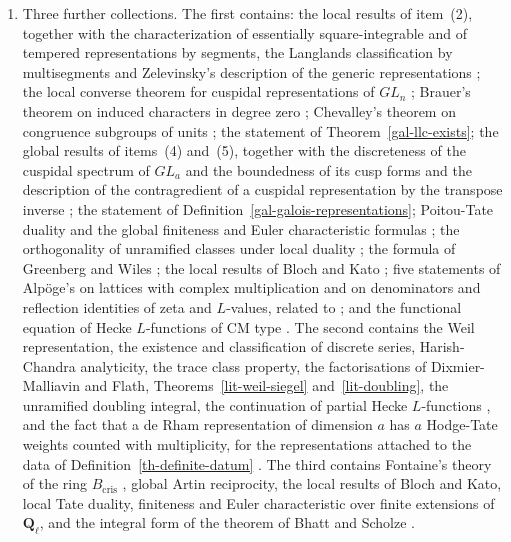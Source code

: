 \begin{theorem}
\begin{enumerate}
  Berger's theorem that de Rham representations are potentially semistable
  \cite{Ber02}; Theorem~\ref{lit-bhatt-scholze};
  Theorem~\ref{lit-chebotarev-degree-one} and a second form of the
  Chebotarev density theorem \cite{Che26,Neu99}; the existence, for each prime
  $p\equiv3\pmod 4$ with $p>3$, of an elliptic curve with complex
  multiplication by the integers of $\mathbf Q(\sqrt{-p})$, good reduction
  outside $p$ and minimal discriminant $-p^3$ \cite{Gro80}; Weber's
  description of ray class fields of imaginary quadratic fields
  \cite[Theorem~II.5.6]{Sil94}; and local Tate duality, the finiteness of
  local Galois cohomology and the local Euler characteristic formula
  \cite[Chapter~VII]{NSW08}.
\item Three further collections. The first contains: the local results of
  item~(2), together with the characterization of essentially
  square-integrable and of tempered representations by segments, the
  Langlands classification by multisegments and Zelevinsky's description of
  the generic representations \cite[\S9]{Zel80}; the local converse theorem
  for cuspidal representations of $GL_n$ \cite{Hen93}; Brauer's theorem on
  induced characters in degree zero \cite{Bra47}; Chevalley's theorem on
  congruence subgroups of units \cite{Che51}; the statement of
  Theorem~\ref{gal-llc-exists}; the global results of items~(4) and~(5),
  together with the discreteness of the cuspidal spectrum of $GL_a$ and the
  boundedness of its cusp forms \cite{GGPS69,MW95} and the description of the
  contragredient of a cuspidal representation by the transpose inverse
  \cite{GK75,JS81b}; the statement of
  Definition~\ref{gal-galois-representations}; Poitou-Tate duality and the
  global finiteness and Euler characteristic formulas
  \cite[Chapter~VIII]{NSW08}; the orthogonality of unramified classes under
  local duality \cite[Chapter~VII]{NSW08}; the formula of Greenberg and Wiles
  \cite[Proposition~1.6]{Wil95}; the local results of Bloch and Kato
  \cite[\S3]{BK90}; five statements of Alpöge's on lattices with complex
  multiplication and on denominators and reflection identities of zeta and
  $L$-values, related to \cite{Shi71,Dam70,DR80}; and the functional equation
  of Hecke $L$-functions of CM type \cite{Hec20,Tat67}. The second contains
  the Weil representation, the existence and classification of discrete
  series, Harish-Chandra analyticity, the trace class property, the
  factorisations of Dixmier-Malliavin and Flath,
  Theorems~\ref{lit-weil-siegel} and~\ref{lit-doubling}, the unramified
  doubling integral, the continuation of partial Hecke $L$-functions
  \cite{Hec20,Tat67}, and the fact that a de Rham representation of dimension
  $a$ has $a$ Hodge-Tate weights counted with multiplicity, for the
  representations attached to the data of Definition~\ref{th-definite-datum}
  \cite{Fon94}. The third contains Fontaine's theory of the ring
  $B_{\mathrm{cris}}$ \cite{Fon94a}, global Artin reciprocity, the local
  results of Bloch and Kato, local Tate duality, finiteness and Euler
  characteristic over finite extensions of $\mathbf Q_\ell$, and the integral
  form of the theorem of Bhatt and Scholze \cite{BS23}.
\end{enumerate}
\end{theorem}
